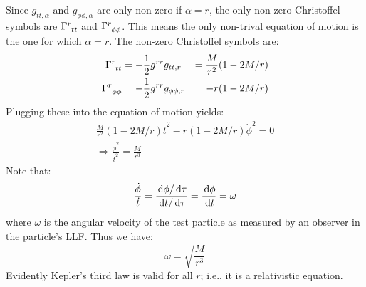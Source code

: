 Since $g_{tt,\alpha}$ and $g_{\phi\phi,\alpha}$ are only non-zero if $\alpha = r$, the only non-zero Christoffel symbols are $\Gamma\indices{^r_{tt}}$ and $\Gamma\indices{^r_{\phi\phi}}$. This means the only non-trival equation of motion is the one for which $\alpha = r$. The non-zero Christoffel symbols are:
\begin{subequations}
\begin{align}
\Gamma\indices{^r_{tt}} &= -\frac{1}{2} g^{rr}g_{tt,r} &= \frac{M}{r^2}(1 - 2M/r) \\
\Gamma\indices{^r_{\phi\phi}} &= -\frac{1}{2} g^{rr}g_{\phi\phi,r} &= -r(1-2M/r)
\end{align}
\end{subequations}
Plugging these into the equation of motion yields:
\begin{align*}
\frac{M}{r^2}(1 - 2M/r)\dot{t}^2 - r(1-2M/r)\dot{\phi}^2 = 0 \\
\Rightarrow \frac{\dot{\phi}^2}{\dot{t}^2} = \frac{M}{r^3}
\end{align*}
Note that:
\begin{equation}
\frac{\dot{\phi}}{\dot{t}} = \frac{\,\mathrm{d}\phi/\,\mathrm{d}\tau}{\,\mathrm{d} t/\,\mathrm{d}\tau} = \frac{\,\mathrm{d}\phi}{\,\mathrm{d} t} = \omega
\end{equation}
where $\omega$ is the angular velocity of the test particle as measured by an observer in the particle's \ac{LLF}. Thus we have:
\begin{equation}
\omega = \sqrt{\frac{M}{r^3}}
\end{equation}
Evidently Kepler's third law is valid for all $r$; i.e., it is a relativistic equation. 

